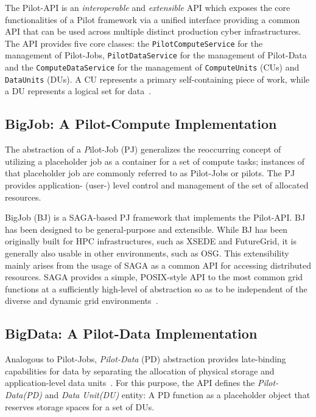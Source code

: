 \documentclass{acm_proc_article-sp}
\newcommand{\pilot}{Pilot\xspace}
\newcommand{\pilotjob}{Pilot-Job\xspace}
\newcommand{\pilotjobs}{Pilot-Jobs\xspace}
\newcommand{\pilotcompute}{Pilot-Compute\xspace}
\newcommand{\dataunit}{Data Unit\xspace}
\newcommand{\dus}{DUs\xspace}
\newcommand{\pilotdata}{Pilot-Data\xspace}
\newcommand{\pd}{PD\xspace}
\begin{document}
The Pilot-API is an {\it interoperable} and {\it extensible} API which
exposes the core functionalities of a \pilot framework via a unified
interface providing a common API that can be used across multiple
distinct production cyber infrastructures.  The API provides five
core classes: the \texttt{PilotComputeService} for the management of
Pilot-Jobs, \texttt{PilotDataService} for the management of Pilot-Data
and the \texttt{ComputeDataService} for the management of
\texttt{ComputeUnits} (CUs) and \texttt{DataUnits} (DUs). 
A CU represents a primary self-containing piece of work, while a DU
represents a logical set for data~\cite{pstar-2012}.

 
\subsection{BigJob: A \pilotcompute Implementation}

The abstraction of a {\emph \pilotjob} (PJ) generalizes the
reoccurring concept of utilizing a placeholder job as a container for
a set of compute tasks; instances of that placeholder job are commonly
referred to as Pilot-Jobs or pilots. The PJ provides application-
(user-) level control and management of the set of allocated resources.

BigJob (BJ) is a SAGA-based PJ framework that implements the Pilot-API. 
BJ has been designed to be general-purpose and extensible.  While BJ 
has been originally built for HPC infrastructures, such as XSEDE and 
FutureGrid, it is generally also usable in other environments, such 
as OSG.  This extensibility mainly arises
from the usage of SAGA as a common API for accessing distributed
resources.  SAGA provides a simple, POSIX-style API to the most common
grid functions at a sufficiently high-level of abstraction so as to be
independent of the diverse and dynamic grid environments~\cite{pstar-2012}.

\subsection{BigData: A \pilotdata Implementation}

Analogous to \pilotjobs, {\it Pilot-Data} (PD) abstraction provides
late-binding capabilities for data by separating the allocation of
physical storage and application-level data units~\cite{pstar-2012}.
For this purpose, the API defines the {\it \pilotdata (PD)} and 
{\it \dataunit (DU)} entity: A \pd function as a 
placeholder object that reserves storage spaces for a set of \dus.
\end{document}
